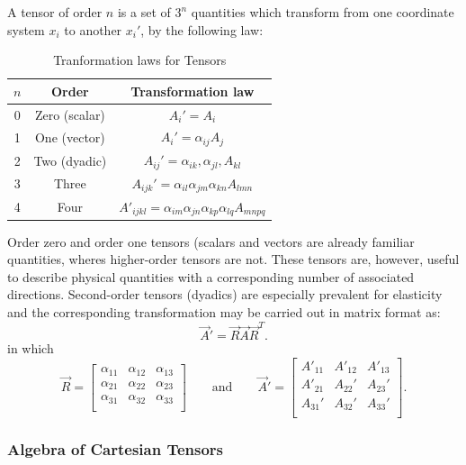 A tensor of order $n$ is a set of $3^{n}$ quantities which transform from one coordinate system $x_i$ to another $x_i'$, by the following law:

\begin{table}[ht]
\centering
\caption{Tranformation laws for Tensors}
\begin{tabular}{c|c|c}
$n$ & Order & Transformation law \\
\hline
0 & Zero (scalar) & $A_i' = A_i$ \\
1 & One (vector) & $A_i' = \alpha_{ij} A_j$ \\
2 & Two (dyadic) & $A_{ij}' = \alpha_{ik}, \alpha_{jl}, A_{kl}$ \\
3 & Three & $A_{ijk}' = \alpha_{il}\alpha_{jm}\alpha_{kn} A_{lmn}$ \\
4 & Four & $A'_{ijkl} = \alpha_{im} \alpha_{jn} \alpha_{kp} \alpha_{lq} A_{mnpq}$
\end{tabular}
\end{table}

Order zero and order one tensors (scalars and vectors are already familiar quantities, wheres higher-order tensors are not.
These tensors are, however, useful to describe physical quantities with a corresponding number of associated directions.
Second-order tensors (dyadics) are especially prevalent for elasticity and the corresponding transformation may be carried out in matrix format as:
\begin{equation*}
  \Vec{A}' = \Vec{R} \Vec{A} \Vec{R}^{T}
.\end{equation*}
in which
\begin{equation*}
  \Vec{R} = \begin{bmatrix}
    \alpha_{11} & \alpha_{12} & \alpha_{13}\\
  \alpha_{21} & \alpha_{22} & \alpha_{23}\\
  \alpha_{31} & \alpha_{32} & \alpha_{33}\\
  \end{bmatrix} \qquad  \text{and} \qquad \Vec{A}' = \begin{bmatrix}
    A'_{11} & A'_{12} & A'_{13}\\
  A'_{21} & A_{22}' & A_{23}'\\
  A_{31}' & A_{32}' & A_{33}'\\
  \end{bmatrix}
.\end{equation*}


\subsubsection{Algebra of Cartesian Tensors}

